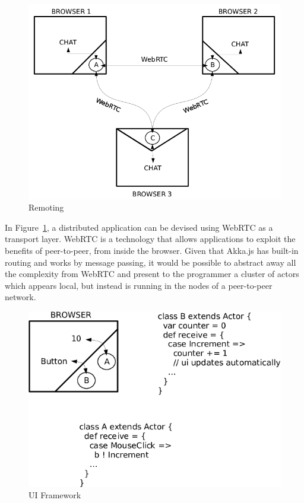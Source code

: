 \documentclass{sig-alternate}
\begin{document}
\begin{figure}
\centering
\includegraphics[scale=0.2]{1.png}
\caption{Remoting}
\label{fig:remoting}
\end{figure}

In Figure~\ref{fig:remoting}, a distributed application can be devised using WebRTC as a transport layer.
WebRTC is a technology that allows applications to exploit the benefits of peer-to-peer, from inside
the browser. Given that Akka.js has built-in routing and works by message passing, it would be
possible to abstract away all the complexity from WebRTC and present to the programmer a cluster of
actors which appears local, but instead is running in the nodes of a peer-to-peer network.

\begin{figure}
\centering
\includegraphics[scale=0.2]{2.png}
\caption{UI Framework}
\label{fig:ui}
\end{figure}
\end{document}
